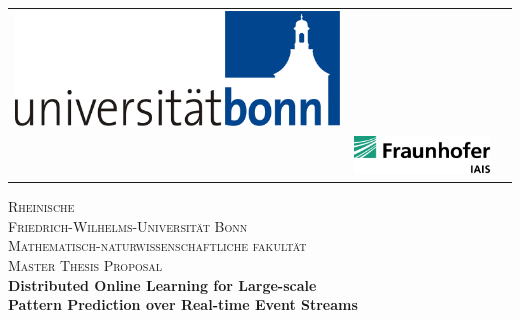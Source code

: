 \begin{titlepage}
		\begin{center}
			\setlength{\tabcolsep}{0pt}
			\begin{tabular}{>{\raggedleft}m{2.5cm}>{\centering}m{\dimexpr\textwidth - 5cm\relax}>{\raggedright}m{2.5cm}}
				\includegraphics[width=\linewidth]{figures/logo.pdf}%
				&%
				\textbf{\large } \\[5pt]%
				\textbf{\large}%
				&%
				\includegraphics[width=\linewidth]{figures/iais.pdf} %
			\end{tabular}
			
			
			\textsc{\LARGE Rheinische\\[5mm] Friedrich-Wilhelms-Universität Bonn}\\[1.0cm]
			
			\textsc{\Large Mathematisch-naturwissenschaftliche fakultät}\\[1.0cm]
			
			\textsc{\Large Master Thesis Proposal }\\[1.5cm]
			
			{ \Large \bfseries 
				Distributed Online Learning for Large-scale  \\Pattern Prediction over Real-time Event Streams}\\[2.9cm]
			

\end{center}
\end{titlepage}
